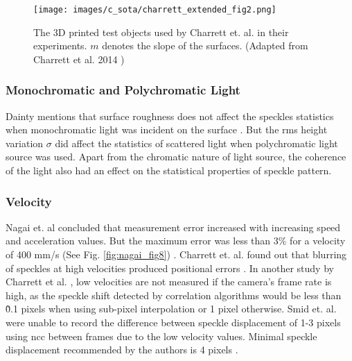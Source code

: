     \begin{figure}[h]
        \centering
        \texttt{[image: images/c\_sota/charrett\_extended\_fig2.png]}
        \caption{The 3D printed test objects used by Charrett et. al. in their experiments. $m$ denotes the slope of the surfaces. (Adapted from Charrett et al. 2014 \cite{charrett_extended_theory})}
        \label{fig:charrett_extended_fig2}
    \end{figure}

    \subsubsection{Monochromatic and Polychromatic Light}
    Dainty mentions that surface roughness does not affect the speckles statistics when monochromatic light was incident on the surface \cite{dainty}. But the \gls{rms} height variation $\sigma$ did affect the statistics of scattered light when polychromatic light source was used. Apart from the chromatic nature of light source, the coherence of the light also had an effect on the statistical properties of speckle pattern.

    \subsubsection{Velocity}
    Nagai et. al concluded that measurement error increased with increasing speed and acceleration values. But the maximum error was less than 3\% for a velocity of 400 mm/s (See Fig. \ref{fig:nagai_fig8}) \cite{nagai}. Charrett et. al. found out that blurring of speckles at high velocities produced positional errors \cite{charrett_2018}. In another study by Charrett et al. \cite{charrett_mars}, low velocities are not measured if the camera's frame rate is high, as the speckle shift detected by correlation algorithms would be less than \~0.1 pixels when using sub-pixel interpolation or 1 pixel otherwise. Smid et. al. were unable to record the difference between speckle displacement of 1-3 pixels using \gls{ncc} between frames due to the low velocity values. Minimal speckle displacement recommended by the authors is 4 pixels \cite{smid_2007}.
    
